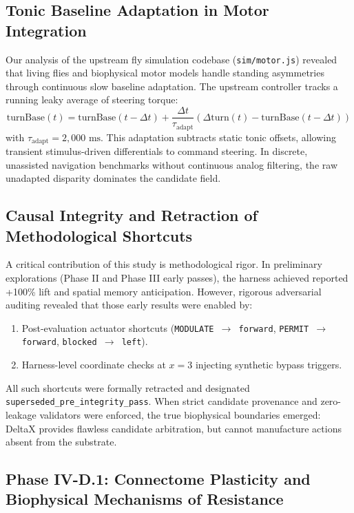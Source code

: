 \documentclass[10pt,letterpaper]{article}
\begin{document}
\subsection{Tonic Baseline Adaptation in Motor Integration}

Our analysis of the upstream fly simulation codebase (\texttt{sim/motor.js}) revealed that living flies and biophysical motor models handle standing asymmetries through continuous slow baseline adaptation. The upstream controller tracks a running leaky average of steering torque:
\begin{equation}
\text{turnBase}(t) = \text{turnBase}(t - \Delta t) + \frac{\Delta t}{\tau_{\text{adapt}}} \left( \Delta \text{turn}(t) - \text{turnBase}(t - \Delta t) \right)
\end{equation}
with $\tau_{\text{adapt}} = 2,000\text{ ms}$. This adaptation subtracts static tonic offsets, allowing transient stimulus-driven differentials to command steering. In discrete, unassisted navigation benchmarks without continuous analog filtering, the raw unadapted disparity dominates the candidate field.

\subsection{Causal Integrity and Retraction of Methodological Shortcuts}

A critical contribution of this study is methodological rigor. In preliminary explorations (Phase II and Phase III early passes), the harness achieved reported +100\% lift and spatial memory anticipation. However, rigorous adversarial auditing revealed that those early results were enabled by:
\begin{enumerate}
    \item Post-evaluation actuator shortcuts (\texttt{MODULATE $\to$ forward}, \texttt{PERMIT $\to$ forward}, \texttt{blocked $\to$ left}).
    \item Harness-level coordinate checks at $x=3$ injecting synthetic bypass triggers.
\end{enumerate}
All such shortcuts were formally retracted and designated \texttt{superseded\_pre\_integrity\_pass}. When strict candidate provenance and zero-leakage validators were enforced, the true biophysical boundaries emerged: DeltaX provides flawless candidate arbitration, but cannot manufacture actions absent from the substrate.

\subsection{Phase IV-D.1: Connectome Plasticity and Biophysical Mechanisms of Resistance}
\end{document}

